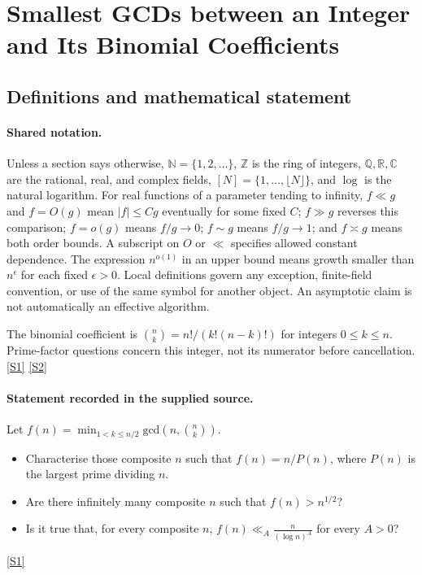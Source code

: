 \documentclass[11pt,a4paper]{article}
\newcommand{\N}{\mathbb{N}}
\newcommand{\Z}{\mathbb{Z}}
\newcommand{\Q}{\mathbb{Q}}
\newcommand{\R}{\mathbb{R}}
\newcommand{\C}{\mathbb{C}}
\newcommand{\sref}[2]{\hyperlink{source:#1:#2}{[S#2]}}
\begin{document}
\section{Smallest GCDs between an Integer and Its Binomial Coefficients}\label{statement}


\subsection{Definitions and mathematical statement}

\paragraph{Shared notation.}Unless a section says otherwise, $\N=\{1,2,\ldots\}$,
$\Z$ is the ring of integers, $\Q,\R,\C$ are the rational, real, and complex
fields, $[N]=\{1,\ldots,\lfloor N\rfloor\}$, and $\log$ is the natural
logarithm. For real functions of a parameter tending to infinity,
$f\ll g$ and $f=O(g)$ mean $|f|\leq Cg$ eventually for some fixed $C$;
$f\gg g$ reverses this comparison; $f=o(g)$ means $f/g\to0$;
$f\sim g$ means $f/g\to1$; and $f\asymp g$ means both order bounds.
A subscript on $O$ or $\ll$ specifies allowed constant dependence.
The expression $n^{o(1)}$ in an upper bound means growth smaller than
$n^\epsilon$ for each fixed $\epsilon>0$. Local definitions govern any
exception, finite-field convention, or use of the same symbol for another
object. An asymptotic claim is not automatically an effective algorithm.



The binomial coefficient is $\binom nk=n!/(k!(n-k)!)$ for integers $0\leq k\leq n$. Prime-factor questions concern this integer, not its numerator before cancellation. \sref{statement}{1} \sref{statement}{2}

\paragraph{Statement recorded in the supplied source.}
Let $ f(n)=\min_{1<k\leq n/2}\textrm{gcd}\left(n,\binom{n}{k}\right). $ \begin{itemize}
\item Characterise those composite $n$ such that $f(n)=n/P(n)$, where $P(n)$ is the largest prime dividing $n$.
\item Are there infinitely many composite $n$ such that $f(n)>n^{1/2}$?
\item  Is it true that, for every composite $n$, $ f(n) \ll_A \frac{n}{(\log n)^A} $ for every $A>0$?
\end{itemize} \sref{statement}{1}
\end{document}
